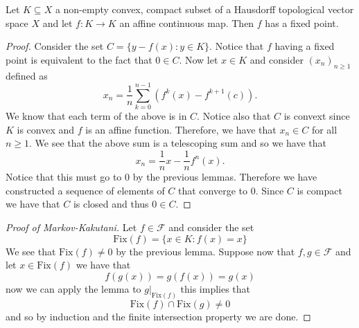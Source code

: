 \begin{lemma}
  Let $K \subseteq X$ a non-empty convex, compact subset of a Hausdorff
  topological vector space $X$ and let $f: K \to K$ an affine continuous map.
  Then  $f$ has a fixed point.
\end{lemma}
\begin{proof}
  Consider the set $C = \{y - f(x): y \in K\}$. Notice that $f$ having a fixed
  point is equivalent to the fact that $0 \in C$. Now let $x \in K$ and
  consider $(x_n)_{n \ge 1}$ defined as
  \[
  x_n = \frac{1}{n} \sum_{k=0}^{n-1} (f^{k}(x) - f^{k + 1}(c))
  .\] 
  We know that each term of the above is in $C$. Notice also that $C$ is
  convext since $K$ is convex and $f$ is an affine function. Therefore, we have
  that $x_n \in C$ for all $n \ge 1$. We see that the above sum is
  a telescoping sum and so we have that
  \[
  x_n = \frac{1}{n}x - \frac{1}{n}f^{n}(x)
  .\] 
  Notice that this must go to 0 by the previous lemmas. Therefore we have
  constructed a sequence of elements of $C$ that converge to 0. Since $C$ is
  compact we have that $C$ is closed and thus $0 \in C$.
\end{proof}
\begin{proof}[Proof of Markov-Kakutani]
  Let $f \in \mathcal{F}$ and consider the set
  \[
  \textrm{Fix}(f) = \{x \in K: f(x) = x\} 
  \] 
  We see that $\textrm{Fix}(f) \neq 0$ by the previous lemma. Suppose now that
  $f, g \in \mathcal{F}$ and let $x \in \textrm{Fix}(f)$ we have that
  \[
  f(g(x)) = g(f(x)) = g(x)
  \] 
  now we can apply the lemma to $g|_{\textrm{Fix}(f)}$ this implies that
  \[
  \textrm{Fix}(f) \cap \textrm{Fix}(g) \neq 0
  \] 
  and so by induction and the finite intersection property we are done.
\end{proof}
